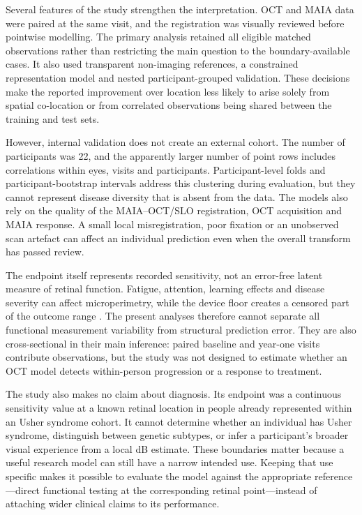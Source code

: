 Several features of the study strengthen the interpretation. OCT and MAIA data were paired at the same visit, and the registration was visually reviewed before pointwise modelling. The primary analysis retained all eligible matched observations rather than restricting the main question to the boundary-available cases. It also used transparent non-imaging references, a constrained representation model and nested participant-grouped validation. These decisions make the reported improvement over location less likely to arise solely from spatial co-location or from correlated observations being shared between the training and test sets.

However, internal validation does not create an external cohort. The number of participants was 22, and the apparently larger number of point rows includes correlations within eyes, visits and participants. Participant-level folds and participant-bootstrap intervals address this clustering during evaluation, but they cannot represent disease diversity that is absent from the data. The models also rely on the quality of the MAIA--OCT/SLO registration, OCT acquisition and MAIA response. A small local misregistration, poor fixation or an unobserved scan artefact can affect an individual prediction even when the overall transform has passed review.

The endpoint itself represents recorded sensitivity, not an error-free latent measure of retinal function. Fatigue, attention, learning effects and disease severity can affect microperimetry, while the device floor creates a censored part of the outcome range \citep{Pfau2021Microperimetry,Karuntu2025}. The present analyses therefore cannot separate all functional measurement variability from structural prediction error. They are also cross-sectional in their main inference: paired baseline and year-one visits contribute observations, but the study was not designed to estimate whether an OCT model detects within-person progression or a response to treatment.

The study also makes no claim about diagnosis. Its endpoint was a continuous sensitivity value at a known retinal location in people already represented within an Usher syndrome cohort. It cannot determine whether an individual has Usher syndrome, distinguish between genetic subtypes, or infer a participant's broader visual experience from a local dB estimate. These boundaries matter because a useful research model can still have a narrow intended use. Keeping that use specific makes it possible to evaluate the model against the appropriate reference---direct functional testing at the corresponding retinal point---instead of attaching wider clinical claims to its performance.

